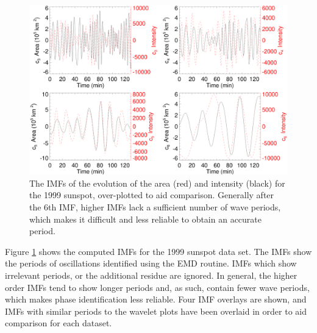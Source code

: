 	
	\begin{figure}
	\centering
	\includegraphics[width=\textwidth]{1999_IMFs.eps}
    \caption{
	      	The IMFs of the evolution of the area (red) and intensity (black) for the 1999 sunspot, over-plotted to aid comparison.
	      	Generally after the $6$th IMF, higher IMFs lack a sufficient number of wave periods, which makes it difficult and less reliable to obtain an accurate period.
   		    }
    \label{1999IMF}
	\end{figure}
		
	Figure \ref{1999IMF} shows the computed IMFs for the 1999 sunspot data set.
	The IMFs show the periods of oscillations identified using the EMD routine.
	IMFs which show irrelevant periods, or the additional residue are ignored.
	In general, the higher order IMFs tend to show longer periods and, as such, contain fewer wave periods, which makes phase identification less reliable.
	Four IMF overlays are shown, and IMFs with similar periods to the wavelet plots have been overlaid in order to aid comparison for each dataset.
	
